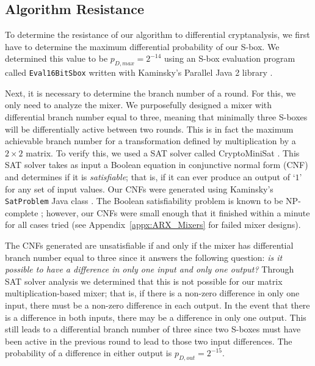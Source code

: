 \subsection{Algorithm Resistance}
To determine the resistance of our algorithm to differential cryptanalysis, we first have to determine the maximum differential probability of our S-box.
We determined this value to be $p_{D,max} = 2^{-14}$ using an S-box evaluation program called \texttt{Eval16BitSbox} written with Kaminsky's Parallel Java 2 library \cite{Kaminsky2014_BlockCipherAnalysis}\cite{Kaminsky2014_PJ2}.

Next, it is necessary to determine the branch number of a round.
For this, we only need to analyze the mixer. 
We purposefully designed a mixer with differential branch number equal to three, meaning that minimally three S-boxes will be differentially active between two rounds.
This is in fact the maximum achievable branch number for a transformation defined by multiplication by a $2 \times 2$ matrix.
To verify this, we used a SAT solver called CryptoMiniSat \cite{Soos2014_CryptoMiniSat}.
This SAT solver takes as input a Boolean equation in conjunctive normal form (CNF) and determines if it is \emph{satisfiable}; that is, if it can ever produce an output of `$1$' for any set of input values.
Our CNFs were generated using Kaminsky's \texttt{SatProblem} Java class \cite{Kaminsky2014_BlockCipherAnalysis}.
The Boolean satisfiability problem is known to be NP-complete \cite{Sipser2012_TheoryOfComputation}; however, our CNFs were small enough that it finished within a minute for all cases tried (see Appendix~\ref{appx:ARX_Mixers} for failed mixer designs).

The CNFs generated are unsatisfiable if and only if the mixer has differential branch number equal to three since it answers the following question: \emph{is it possible to have a difference in only one input and only one output?}
Through SAT solver analysis we determined that this is not possible for our matrix multiplication-based mixer; that is, if there is a non-zero difference in only one input, there must be a non-zero difference in each output.
In the event that there is a difference in both inputs, there may be a difference in only one output.
This still leads to a differential branch number of three since two S-boxes must have been active in the previous round to lead to those two input differences.
The probability of a difference in either output is $p_{D,out} = 2^{-15}$.

